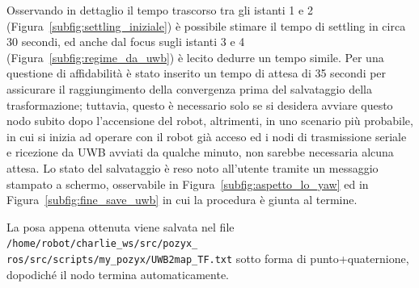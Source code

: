 Osservando in dettaglio il tempo trascorso tra gli istanti 1 e 2 (Figura~\ref{subfig:settling_iniziale}) è possibile stimare il tempo di settling in circa 30 secondi, ed anche dal focus sugli istanti 3 e 4 (Figura~\ref{subfig:regime_da_uwb}) è lecito dedurre un tempo simile. Per una questione di affidabilità è stato inserito un tempo di attesa di 35 secondi per assicurare il raggiungimento della convergenza prima del salvataggio della trasformazione; tuttavia, questo è necessario solo se si desidera avviare questo nodo subito dopo l'accensione del robot, altrimenti, in uno scenario più probabile, in cui si inizia ad operare con il robot già acceso ed i nodi di trasmissione seriale e ricezione da UWB avviati da qualche minuto, non sarebbe necessaria alcuna attesa. Lo stato del salvataggio è reso noto all'utente tramite un messaggio stampato a schermo, osservabile in Figura~\ref{subfig:aspetto_lo_yaw} ed in Figura~\ref{subfig:fine_save_uwb} in cui la procedura è giunta al termine.

La posa appena ottenuta viene salvata nel file \verb!/home/robot/charlie_ws/src/pozyx_!\\ \verb!ros/src/scripts/my_pozyx/UWB2map_TF.txt! \hspace{1mm}sotto forma di punto+quaternione, dopodiché il nodo termina automaticamente.


